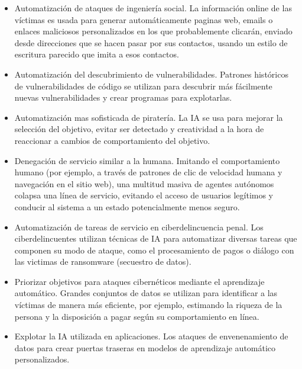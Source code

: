 \documentclass[12pt,a4paper]{article}
\begin{document}
\begin{itemize}

\item Automatización de ataques de ingeniería social. La información online de las víctimas es usada para generar automáticamente paginas web, emails o enlaces maliciosos personalizados en los que probablemente clicarán, enviado desde direcciones que se hacen pasar por sus contactos, usando un estilo de escritura parecido que imita a esos contactos.

\item Automatización del descubrimiento de vulnerabilidades. Patrones históricos de vulnerabilidades de código se utilizan para descubrir más fácilmente nuevas vulnerabilidades y crear programas para explotarlas.

\item Automatización mas sofisticada de piratería. La IA se usa para mejorar la selección del objetivo, evitar ser detectado y creatividad a la hora de reaccionar a cambios de comportamiento del objetivo.

\item Denegación de servicio similar a la humana. Imitando el comportamiento humano (por ejemplo, a través de patrones de clic de velocidad humana y navegación en el sitio web), una multitud masiva de agentes autónomos colapsa una línea de servicio, evitando el acceso de usuarios legítimos y conducir al sistema a un estado potencialmente menos seguro.

\item Automatización de tareas de servicio en ciberdelincuencia penal. Los ciberdelincuentes utilizan técnicas de IA para automatizar diversas tareas que componen su modo de ataque, como el procesamiento de pagos o diálogo con las victimas de ransomware (secuestro de datos).

\item Priorizar objetivos para ataques cibernéticos mediante el aprendizaje automático. Grandes conjuntos de datos se utilizan para identificar a las víctimas de manera más eficiente, por ejemplo, estimando la riqueza de la persona y la disposición a pagar según su comportamiento en línea.

\item Explotar la IA utilizada en aplicaciones. Los ataques de envenenamiento de datos para crear puertas traseras en modelos de aprendizaje automático personalizados.

\end{itemize}
\end{document}
